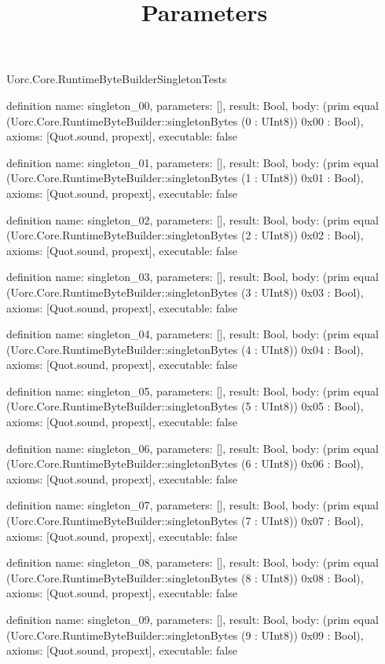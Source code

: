 \begin{lexlean}{Uorc.Core.RuntimeByteBuilderSingletonTests}
\title{Parameters}
\begin{semanticmodule}
definition{
  name: singleton_00,
  parameters: [],
  result: Bool,
  body: (prim equal (Uorc.Core.RuntimeByteBuilder::singletonBytes (0 : UInt8)) 0x00 : Bool),
  axioms: [Quot.sound, propext],
  executable: false
}

definition{
  name: singleton_01,
  parameters: [],
  result: Bool,
  body: (prim equal (Uorc.Core.RuntimeByteBuilder::singletonBytes (1 : UInt8)) 0x01 : Bool),
  axioms: [Quot.sound, propext],
  executable: false
}

definition{
  name: singleton_02,
  parameters: [],
  result: Bool,
  body: (prim equal (Uorc.Core.RuntimeByteBuilder::singletonBytes (2 : UInt8)) 0x02 : Bool),
  axioms: [Quot.sound, propext],
  executable: false
}

definition{
  name: singleton_03,
  parameters: [],
  result: Bool,
  body: (prim equal (Uorc.Core.RuntimeByteBuilder::singletonBytes (3 : UInt8)) 0x03 : Bool),
  axioms: [Quot.sound, propext],
  executable: false
}

definition{
  name: singleton_04,
  parameters: [],
  result: Bool,
  body: (prim equal (Uorc.Core.RuntimeByteBuilder::singletonBytes (4 : UInt8)) 0x04 : Bool),
  axioms: [Quot.sound, propext],
  executable: false
}

definition{
  name: singleton_05,
  parameters: [],
  result: Bool,
  body: (prim equal (Uorc.Core.RuntimeByteBuilder::singletonBytes (5 : UInt8)) 0x05 : Bool),
  axioms: [Quot.sound, propext],
  executable: false
}

definition{
  name: singleton_06,
  parameters: [],
  result: Bool,
  body: (prim equal (Uorc.Core.RuntimeByteBuilder::singletonBytes (6 : UInt8)) 0x06 : Bool),
  axioms: [Quot.sound, propext],
  executable: false
}

definition{
  name: singleton_07,
  parameters: [],
  result: Bool,
  body: (prim equal (Uorc.Core.RuntimeByteBuilder::singletonBytes (7 : UInt8)) 0x07 : Bool),
  axioms: [Quot.sound, propext],
  executable: false
}

definition{
  name: singleton_08,
  parameters: [],
  result: Bool,
  body: (prim equal (Uorc.Core.RuntimeByteBuilder::singletonBytes (8 : UInt8)) 0x08 : Bool),
  axioms: [Quot.sound, propext],
  executable: false
}

definition{
  name: singleton_09,
  parameters: [],
  result: Bool,
  body: (prim equal (Uorc.Core.RuntimeByteBuilder::singletonBytes (9 : UInt8)) 0x09 : Bool),
  axioms: [Quot.sound, propext],
  executable: false
}


\end{semanticmodule}
\end{lexlean}
